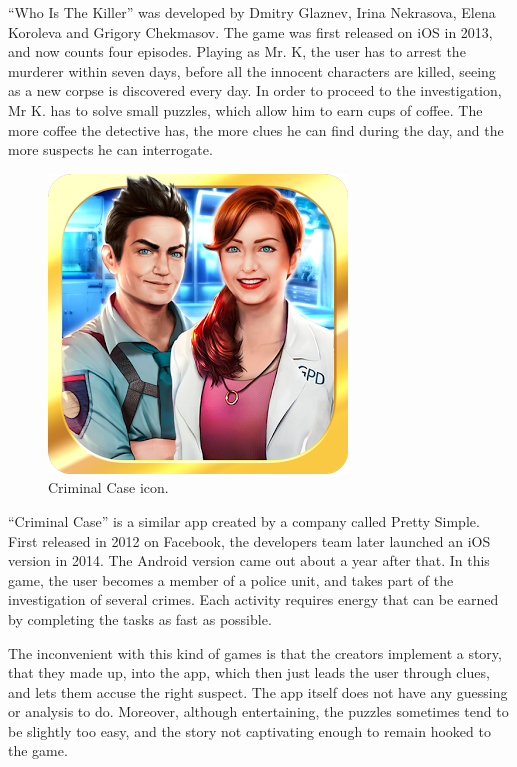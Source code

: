 \documentclass{mproj}
\begin{document}
``Who Is The Killer'' \cite{whoisthekiller} was developed by Dmitry Glaznev, Irina Nekrasova, Elena Koroleva and Grigory Chekmasov. The game was first released on iOS in 2013, and now counts four episodes. Playing as Mr. K, the user has to arrest the murderer within seven days, before all the innocent characters are killed, seeing as a new corpse is discovered every day. In order to proceed to the investigation, Mr K. has to solve small puzzles, which allow him to earn cups of coffee. The more coffee the detective has, the more clues he can find during the day, and the more suspects he can interrogate. \par

\begin{figure}
	\vspace{-10pt}
	\centering
	\includegraphics[scale=0.25]{images/criminalcase_icon}
	\caption{Criminal Case icon.}
	\vspace{-30pt}
\end{figure}

``Criminal Case'' \cite{criminalcase} is a similar app created by a company called Pretty Simple. First released in 2012 on Facebook, the developers team later launched an iOS version in 2014. The Android version came out about a year after that. In this game, the user becomes a member of a police unit, and takes part of the investigation of several crimes. Each activity requires energy that can be earned by completing the tasks as fast as possible.\\ \par

The inconvenient with this kind of games is that the creators implement a story, that they made up, into the app, which then just leads the user through clues, and lets them accuse the right suspect. The app itself does not have any guessing or analysis to do.
Moreover, although entertaining, the puzzles sometimes tend to be slightly too easy, and the story not captivating enough to remain hooked to the game.
\end{document}
